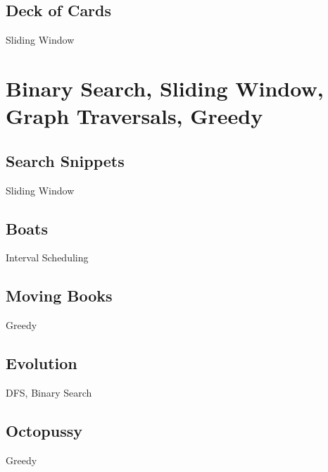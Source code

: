 \documentclass[10pt,a4paper,twoside]{report}
\begin{document}
\newpage
\subsection*{Deck of Cards}
\begin{keywords}Sliding Window\end{keywords}


\newpage
\section{Binary Search, Sliding Window, Graph Traversals, Greedy}

\subsection*{Search Snippets}
\begin{keywords}Sliding Window\end{keywords}


\newpage
\subsection*{Boats}
\begin{keywords}Interval Scheduling\end{keywords}


\newpage
\subsection*{Moving Books}
\begin{keywords}Greedy\end{keywords}


\newpage
\subsection*{Evolution}
\begin{keywords}DFS, Binary Search\end{keywords}


\newpage
\subsection*{Octopussy}
\begin{keywords}Greedy\end{keywords}

\end{document}
